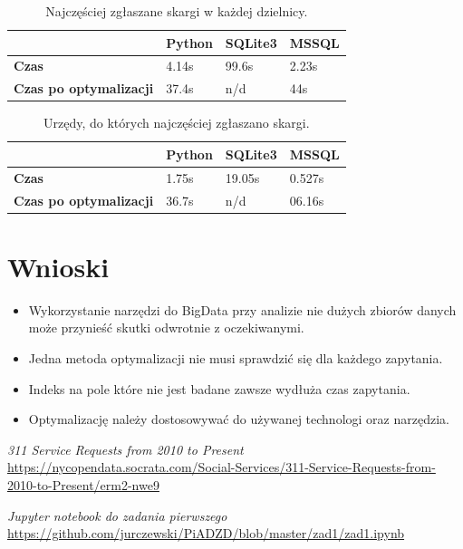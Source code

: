 \documentclass{classrep}
\begin{document}
\begin{table}[H]
\centering
\caption{Najczęściej zgłaszane skargi w każdej dzielnicy.}
\label{tab:calc3}
\begin{tabular}{|l|l|l|l|}
\hline
 & \textbf{Python} & \textbf{SQLite3} & \textbf{MSSQL} \\ \hline
\textbf{Czas} & 4.14s & 99.6s & 2.23s \\ \hline
\textbf{Czas po optymalizacji} & 37.4s & n/d & 44s \\ \hline
\end{tabular}
\end{table}

\begin{table}[H]
\centering
\caption{Urzędy, do których najczęściej zgłaszano skargi.}
\label{tab:calc4}
\begin{tabular}{|l|l|l|l|}
\hline
 & \textbf{Python} & \textbf{SQLite3} & \textbf{MSSQL} \\ \hline
\textbf{Czas} & 1.75s & 19.05s & 0.527s \\ \hline
\textbf{Czas po optymalizacji} & 36.7s & n/d & 06.16s \\ \hline
\end{tabular}
\end{table}

\section{Wnioski}

\begin{itemize}
    \item Wykorzystanie narzędzi do BigData przy analizie nie dużych zbiorów danych może przynieść skutki odwrotnie z oczekiwanymi.
    \item Jedna metoda optymalizacji nie musi sprawdzić się dla każdego zapytania.
    \item Indeks na pole które nie jest badane zawsze wydłuża czas zapytania.
    \item Optymalizację należy dostosowywać do używanej technologi oraz narzędzia.

\end{itemize}


\nocite{*}
\begin{thebibliography}{0}
    \textsl{311 Service Requests from 2010 to Present}
    \url{https://nycopendata.socrata.com/Social-Services/311-Service-Requests-from-2010-to-Present/erm2-nwe9}
    
    \textsl{Jupyter notebook do zadania pierwszego}
    \url{https://github.com/jurczewski/PiADZD/blob/master/zad1/zad1.ipynb}

    
\end{thebibliography}
\end{document}
